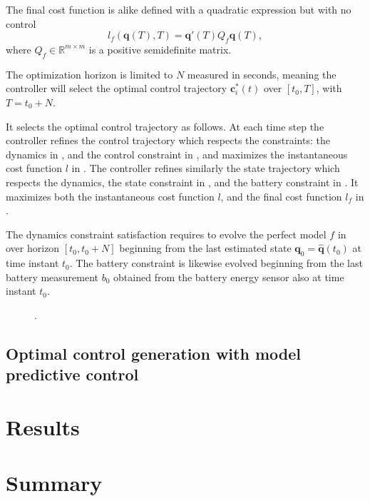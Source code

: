 The final cost function is alike defined with a quadratic expression but with no control
\begin{equation}\label{eq:final-cost-mpc}
  l_f(\mathbf{q}(T),T)=\mathbf{q}'(T)Q_f\mathbf{q}(T),
\end{equation}
where $Q_f\in\mathbb{R}^{m\times m}$ is a positive semidefinite matrix.

The optimization horizon is limited to $N$ measured in seconds, meaning the controller will select the optimal control trajectory $\mathbf{c}_i^*(t)$ over $[t_0,T]$, with $T=t_0+N$.

It selects the optimal control trajectory as follows.
At each time step the controller refines the control trajectory which respects the constraints: the dynamics in , and the control constraint in , and maximizes the instantaneous cost function $l$ in . The controller refines similarly the state trajectory which respects the dynamics, the state constraint in , and the battery constraint in . It maximizes both the instantaneous cost function $l$, and the final cost function $l_f$ in .

The dynamics constraint satisfaction requires to evolve the perfect model $f$ in  over horizon $[t_0,t_0+N]$ beginning from the last estimated state $\mathbf{q}_0=\hat{\mathbf{q}}(t_0)$ at time instant $t_0$. The battery constraint is likewise evolved beginning from the last battery measurement $b_0$ obtained from the battery energy sensor also at time instant $t_0$.

\begin{figure}[h]
  \centering
  \selectfont
  
  \caption[.]{.}
  \label{fig:plot-7}
\end{figure}

\subsection{\color{red}Optimal control generation with model predictive control}
\label{sec:opt-cont-gener}

\section{\color{red}Results}


\section{\color{red}Summary}

